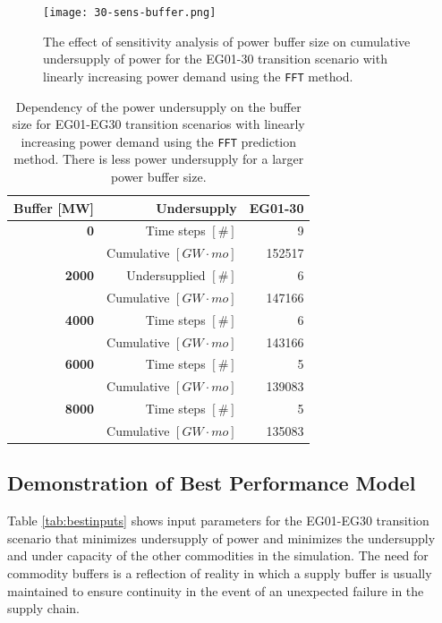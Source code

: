 \begin{figure}[]
		\centering
		\texttt{[image: 30-sens-buffer.png]} 
    \caption{The effect of sensitivity analysis of power buffer size on cumulative 
    undersupply of power for the EG01-30 transition scenario with linearly 
    increasing power demand using the \texttt{FFT} method.}
    \label{fig:eg30-bufplot}
\end{figure}

\begin{table}[h]
    \centering
    \doublespacing
	\caption{Dependency of the power undersupply on the buffer size 
	for EG01-EG30 transition scenarios with linearly 
    increasing power demand using the \texttt{FFT} prediction method.
    There is less power undersupply for a larger power buffer size.}
	\label{tab:buff_size}
	\small
	\begin{tabular}{rrr}
                \hline
                \textbf{Buffer [MW]}     & \textbf{Undersupply}               & \textbf{EG01-30} \\
		\hline
		\textbf{0}             & Time steps $[\#]$  & 9\\  
                      & Cumulative $[GW\cdot mo]$    & 152517 \\ \hline
        \textbf{2000}          & Undersupplied $[\#]$ & 6 \\  
        	      & Cumulative $[GW\cdot mo]$   & 147166 \\ \hline
        \textbf{4000}         & Time steps $[\#]$ & 6 \\  
				  & Cumulative $[GW\cdot mo]$     & 143166 \\ \hline
        \textbf{6000}          & Time steps $[\#]$  & 5 \\  
		& Cumulative $[GW\cdot mo]$     & 139083 \\ \hline
        \textbf{8000}          & Time steps $[\#]$  & 5  \\  
	              & Cumulative $[GW\cdot mo]$  & 135083 \\ \hline
	\end{tabular}
\end{table}

\subsection{Demonstration of Best Performance Model}
Table \ref{tab:bestinputs} 
shows \deploy input parameters for the 
EG01-EG30 transition scenario
that minimizes undersupply of power and minimizes 
the undersupply and under capacity of the other commodities
in the simulation. 
The need for commodity buffers is a reflection of reality
in which a supply buffer is usually maintained to ensure 
continuity in the event of an unexpected failure in the supply chain.

